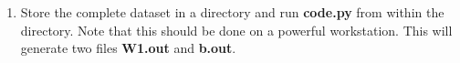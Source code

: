 \documentclass[journal,12pt,twocolumn]{IEEEtran}
\renewcommand\thesection{\arabic{section}}
\begin{document}
\begin{enumerate}[label=\thesection.\arabic*
,ref=\thesection.\theenumi]
\item Store the complete dataset in a directory and run \textbf{code.py} from  within the 
directory.  Note that this should be done on a powerful workstation. This will generate two files
\textbf{W1.out} and \textbf{b.out}.
\end{enumerate}
\end{document}
